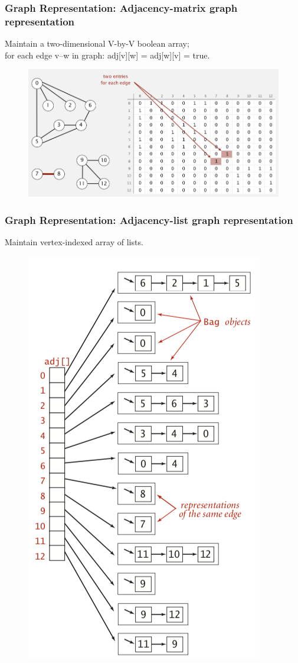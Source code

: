 \documentclass[11pt]{beamer}
\begin{document}
\begin{frame}
	\frametitle	{Graph Representation: Adjacency-matrix graph representation} 
    Maintain a two-dimensional V-by-V boolean array;\\
    for each edge v–w in graph: adj[v][w] = adj[w][v] = true.
    \begin{figure}
    	\centering
    	\includegraphics[width=0.9\linewidth]{"Screenshot 2020-11-30 at 10.25.49 PM"}
    	\label{fig:screenshot-2020-11-30-at-10}
    \end{figure}
    
\end{frame}
\begin{frame}
	\frametitle	{Graph Representation: Adjacency-list graph representation} 
	Maintain vertex-indexed array of lists.
	\begin{figure}
		\centering
		\includegraphics[width=0.4\linewidth]{"Screenshot 2020-11-30 at 10.29.20 PM"}
		\label{fig:screenshot-2020-11-30-at-10}
	\end{figure}	
\end{frame}
\end{document}
